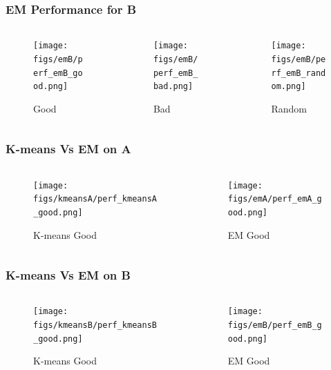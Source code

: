 \documentclass[11pt]{beamer}
\begin{document}
\begin{frame}
\frametitle{EM Performance for B}
\begin{columns}
\begin{column}{.3\textwidth}
\begin{figure}
  \texttt{[image: figs/emB/perf\_emB\_good.png]}
  \caption{Good}
\end{figure}
\end{column}
\begin{column}{.3\textwidth}
\begin{figure}
  \texttt{[image: figs/emB/perf\_emB\_bad.png]}
  \caption{Bad}
\end{figure}
\end{column}

\begin{column}{.3\textwidth}
\begin{figure}
  \texttt{[image: figs/emB/perf\_emB\_random.png]}
  \caption{Random}
\end{figure}
\end{column}

\end{columns}
\end{frame}

\begin{frame}
\frametitle{K-means Vs EM on A}
\begin{columns}
\begin{column}{.3\textwidth}
\begin{figure}
  \texttt{[image: figs/kmeansA/perf\_kmeansA\_good.png]}
  \caption{K-means Good}
\end{figure}
\end{column}
\begin{column}{.3\textwidth}
\begin{figure}
  \texttt{[image: figs/emA/perf\_emA\_good.png]}
  \caption{EM Good}
\end{figure}
\end{column}
\end{columns}
\end{frame}

\begin{frame}
\frametitle{K-means Vs EM on B}
\begin{columns}
\begin{column}{.3\textwidth}
\begin{figure}
  \texttt{[image: figs/kmeansB/perf\_kmeansB\_good.png]}
  \caption{K-means Good}
\end{figure}
\end{column}
\begin{column}{.3\textwidth}
\begin{figure}
  \texttt{[image: figs/emB/perf\_emB\_good.png]}
  \caption{EM Good}
\end{figure}
\end{column}
\end{columns}
\end{frame}
\end{document}
